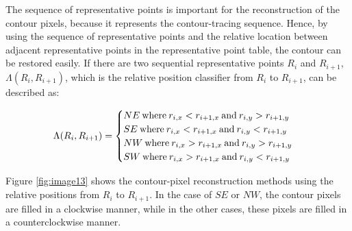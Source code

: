 \documentclass[sensors,article,accept,moreauthors,pdftex,10pt,a4paper]{mdpi}
\begin{document}
The sequence of representative points is important for the reconstruction of the contour pixels, because it represents the contour-tracing sequence. Hence, by using the sequence of representative points and the relative location between adjacent representative points in the representative point table, the contour can be restored easily. If there are two sequential representative points $R_i$ and $R_{i+1}$, $\Lambda(R_i, R_{i+1})$, which is the relative position classifier from $R_i$ to $R_{i+1}$, can be described as: 

\begin{equation}
	\Lambda(R_i, R_{i+1}) = \begin{cases}
	NE\: \text{where\:} r_{i,x} < r_{i+1,x}\: \text{and\:} r_{i,y} > r_{i+1,y} \\ 
	SE\: \text{where\:} r_{i,x} < r_{i+1,x}\: \text{and\:} r_{i,y} < r_{i+1,y} \\ 
	NW\: \text{where\:} r_{i,x} > r_{i+1,x}\: \text{and\:} r_{i,y} > r_{i+1,y} \\ 
	SW\: \text{where\:} r_{i,x} > r_{i+1,x}\: \text{and\:} r_{i,y} < r_{i+1,y}
	\end{cases}
	\label{eq:lambda}
\end{equation}

Figure \ref{fig:image13} shows the contour-pixel reconstruction methods using the relative positions from $R_i$ to $R_{i+1}$. In the case of $SE$ or $NW$, the contour pixels are filled in a clockwise manner, while in the other cases, these pixels are filled in a counterclockwise manner.
\end{document}
